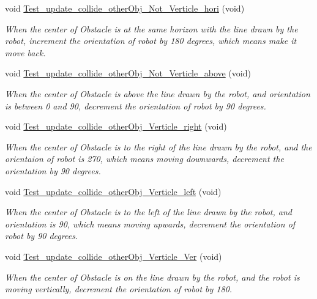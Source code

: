 \begin{DoxyCompactItemize}
void \hyperlink{classEnvironmentClassTest_a03c106d609ce4cc49cd522f976cd4954}{Test\-\_\-update\-\_\-collide\-\_\-other\-Obj\-\_\-\-Not\-\_\-\-Verticle\-\_\-hori} (void)
\begin{DoxyCompactList}\small\item\em When the center of Obstacle is at the same horizon with the line drawn by the robot, increment the orientation of robot by 180 degrees, which means make it move back. \end{DoxyCompactList}\item 
void \hyperlink{classEnvironmentClassTest_a4a6193973d424e61be7b0c1a2d3f09ad}{Test\-\_\-update\-\_\-collide\-\_\-other\-Obj\-\_\-\-Not\-\_\-\-Verticle\-\_\-above} (void)
\begin{DoxyCompactList}\small\item\em When the center of Obstacle is above the line drawn by the robot, and orientation is between 0 and 90, decrement the orientation of robot by 90 degrees. \end{DoxyCompactList}\item 
void \hyperlink{classEnvironmentClassTest_ad2ac784ce8639415ead66cb3e1ab09e9}{Test\-\_\-update\-\_\-collide\-\_\-other\-Obj\-\_\-\-Verticle\-\_\-right} (void)
\begin{DoxyCompactList}\small\item\em When the center of Obstacle is to the right of the line drawn by the robot, and the orientaion of robot is 270, which means moving downwards, decrement the orientation by 90 degrees. \end{DoxyCompactList}\item 
void \hyperlink{classEnvironmentClassTest_aae3e2db645184add94f5735d2f0b25e6}{Test\-\_\-update\-\_\-collide\-\_\-other\-Obj\-\_\-\-Verticle\-\_\-left} (void)
\begin{DoxyCompactList}\small\item\em When the center of Obstacle is to the left of the line drawn by the robot, and orientation is 90, which means moving upwards, decrement the orientation of robot by 90 degrees. \end{DoxyCompactList}\item 
void \hyperlink{classEnvironmentClassTest_a6c143d7020eeb3ee83591606bcb3eca0}{Test\-\_\-update\-\_\-collide\-\_\-other\-Obj\-\_\-\-Verticle\-\_\-\-Ver} (void)
\begin{DoxyCompactList}\small\item\em When the center of Obstacle is on the line drawn by the robot, and the robot is moving vertically, decrement the orientation of robot by 180. \end{DoxyCompactList}\item 

\end{DoxyCompactItemize}

